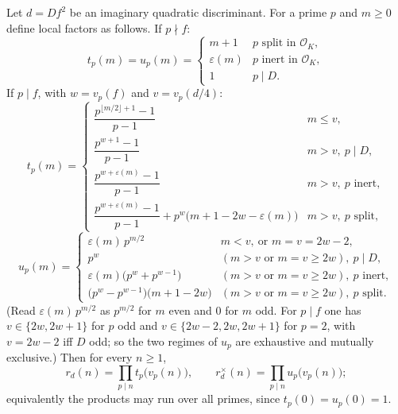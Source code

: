 \begin{theorem}
  \label{infra-glue}
  Let $d = Df^2$ be an imaginary quadratic discriminant. For a prime $p$ and
  $m \geq 0$ define local factors as follows. If $p \nmid f$:
  \[
    t_p(m) = u_p(m) =
    \begin{cases}
      m + 1 & p \text{ split in } \mathcal{O}_K,\\
      \varepsilon(m) & p \text{ inert in } \mathcal{O}_K,\\
      1 & p \mid D.
    \end{cases}
  \]
  If $p \mid f$, with $w = v_p(f)$ and $v = v_p(d/4)$:
  \[
    t_p(m) =
    \begin{cases}
      \dfrac{p^{\lfloor m/2 \rfloor + 1} - 1}{p - 1} & m \leq v,\\[2ex]
      \dfrac{p^{w+1} - 1}{p - 1} & m > v,\ p \mid D,\\[2ex]
      \dfrac{p^{w+\varepsilon(m)} - 1}{p - 1} & m > v,\ p \text{ inert},\\[2ex]
      \dfrac{p^{w+\varepsilon(m)} - 1}{p - 1}
        + p^w\bigl(m + 1 - 2w - \varepsilon(m)\bigr) & m > v,\ p \text{ split},
    \end{cases}
  \]
  \[
    u_p(m) =
    \begin{cases}
      \varepsilon(m)\, p^{m/2}
        & m < v,\ \text{or } m = v = 2w - 2,\\
      p^w
        & (m > v \text{ or } m = v \geq 2w),\ p \mid D,\\
      \varepsilon(m)\bigl(p^w + p^{w-1}\bigr)
        & (m > v \text{ or } m = v \geq 2w),\ p \text{ inert},\\
      \bigl(p^w - p^{w-1}\bigr)\bigl(m + 1 - 2w\bigr)
        & (m > v \text{ or } m = v \geq 2w),\ p \text{ split}.
    \end{cases}
  \]
  (Read $\varepsilon(m)\,p^{m/2}$ as $p^{m/2}$ for $m$ even and $0$ for $m$
  odd. For $p \mid f$ one has $v \in \{2w, 2w+1\}$ for $p$ odd and
  $v \in \{2w-2, 2w, 2w+1\}$ for $p = 2$, with $v = 2w-2$ iff $D$ odd; so the
  two regimes of $u_p$ are exhaustive and mutually exclusive.)
  Then for every $n \geq 1$,
  \[
    r_d(n) = \prod_{p \mid n} t_p\bigl(v_p(n)\bigr),
    \qquad
    r_d^{\times}(n) = \prod_{p \mid n} u_p\bigl(v_p(n)\bigr);
  \]
  equivalently the products may run over all primes, since
  $t_p(0) = u_p(0) = 1$.
\end{theorem}

